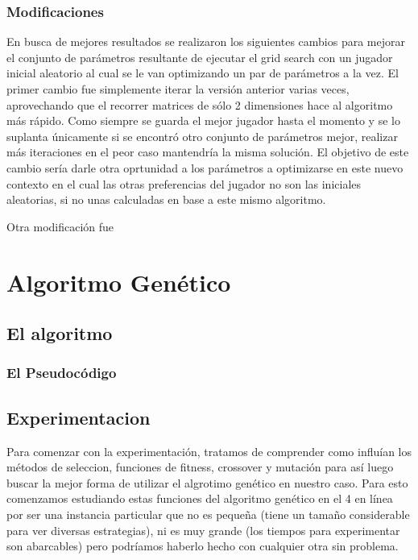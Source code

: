 \documentclass[A4paper,oneside,fleqn,11pt]{article}
\theoremstyle{definition}
\begin{document}
\subsubsection{Modificaciones}

En busca de mejores resultados se realizaron los siguientes cambios para mejorar el conjunto de parámetros resultante de ejecutar el grid search con un jugador inicial aleatorio al cual se le van optimizando un par de parámetros a la vez. El primer cambio fue simplemente iterar la versión anterior varias veces, aprovechando que el recorrer matrices de sólo 2 dimensiones hace al algoritmo más rápido. Como siempre se guarda el mejor jugador hasta el momento y se lo suplanta únicamente si se encontró otro conjunto de parámetros mejor, realizar más iteraciones en el peor caso mantendría la misma solución. El objetivo de este cambio sería darle otra oprtunidad a los parámetros a optimizarse en este nuevo contexto en el cual las otras preferencias del jugador no son las iniciales aleatorias, si no unas calculadas en base a este mismo algoritmo. 

Otra modificación fue 


















\section{Algoritmo Genético}



\subsection{El algoritmo}

\subsubsection{El Pseudocódigo}



\subsection{Experimentacion}

Para comenzar con la experimentación, tratamos de comprender como influían los métodos de seleccion, funciones de fitness, crossover y mutación para así luego buscar la mejor forma de utilizar el algrotimo genético en nuestro caso. Para esto comenzamos estudiando estas funciones del algoritmo genético en el 4 en línea por ser una instancia particular que no es pequeña (tiene un tamaño considerable para ver diversas estrategias), ni es muy grande (los tiempos para experimentar son abarcables) pero podríamos haberlo hecho con cualquier otra sin problema.
\end{document}
